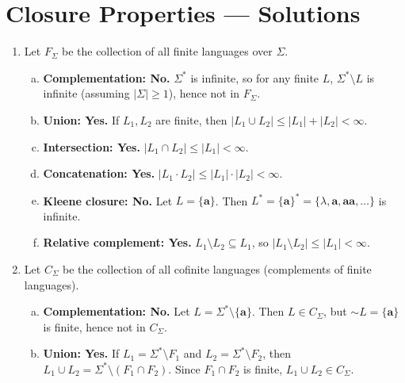 
\chapter{Closure Properties --- Solutions}

\begin{enumerate}[{5.}1. ]

\item Let $F_\Sigma$ be the collection of all finite languages over $\Sigma$.

\begin{enumerate}[(a)]
  \item \textbf{Complementation: No.}  $\Sigma^*$ is infinite, so for any finite $L$,
  $\Sigma^*\setminus L$ is infinite (assuming $|\Sigma|\ge 1$), hence not in $F_\Sigma$.

  \item \textbf{Union: Yes.}  If $L_1,L_2$ are finite, then $|L_1\cup L_2|\le|L_1|+|L_2|<\infty$.

  \item \textbf{Intersection: Yes.}  $|L_1\cap L_2|\le|L_1|<\infty$.

  \item \textbf{Concatenation: Yes.}  $|L_1\cdot L_2|\le|L_1|\cdot|L_2|<\infty$.

  \item \textbf{Kleene closure: No.}  Let $L=\{\pmb{a}\}$.  Then $L^*=\{\pmb{a}\}^*=\{\lambda,\pmb{a},\pmb{aa},\ldots\}$ is infinite.

  \item \textbf{Relative complement: Yes.}  $L_1\setminus L_2\subseteq L_1$, so $|L_1\setminus L_2|\le|L_1|<\infty$.
\end{enumerate}

\item Let $C_\Sigma$ be the collection of all cofinite languages (complements of finite languages).

\begin{enumerate}[(a)]
  \item \textbf{Complementation: No.}  Let $L=\Sigma^*\setminus\{\pmb{a}\}$.  Then
  $L\in C_\Sigma$, but $\sim L=\{\pmb{a}\}$ is finite, hence not in $C_\Sigma$.

  \item \textbf{Union: Yes.}  If $L_1=\Sigma^*\setminus F_1$ and $L_2=\Sigma^*\setminus F_2$, then $L_1\cup L_2=\Sigma^*\setminus(F_1\cap F_2)$.  Since $F_1\cap F_2$ is finite, $L_1\cup L_2\in C_\Sigma$.


\end{enumerate}
\end{enumerate}
